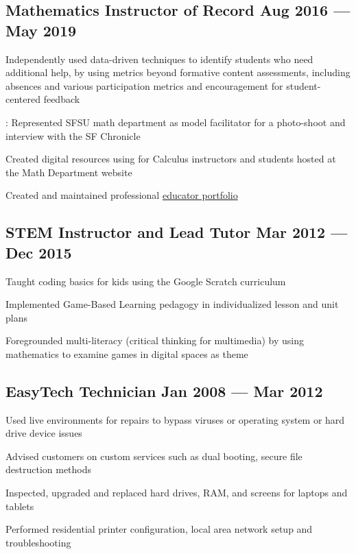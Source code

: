 \documentclass[letter,10pt]{article}
\begin{document}
\subsection{Mathematics Instructor of Record  \hfill	Aug 2016 --- May 2019}
\begin{zitemize}
\item Independently used data-driven techniques to identify students who need additional help, by using metrics beyond formative content assessments, including absences and various participation metrics and encouragement for student-centered feedback
\item {}: Represented SFSU math department as model facilitator for a photo-shoot and interview with the SF Chronicle
\item Created digital resources using  for Calculus instructors and students hosted at the Math Department website  
\item Created and maintained professional  \href{http://www.mathwithtimmy.com}{educator portfolio}
\end{zitemize}

\subsection{STEM Instructor and Lead Tutor \hfill	Mar 2012 --- Dec 2015}
\begin{zitemize}
\item Taught coding basics for kids using the Google Scratch curriculum
\item Implemented Game-Based Learning pedagogy in individualized lesson and unit plans
\item Foregrounded multi-literacy (critical thinking for multimedia) by using mathematics to examine games in digital spaces as theme
\end{zitemize}
\subsection{EasyTech Technician \hfill	Jan 2008 --- Mar 2012}
\begin{zitemize}
\item Used  live environments for repairs to bypass viruses or operating system or hard drive device issues
\item Advised customers on custom services such as dual booting, secure file destruction methods
\item Inspected, upgraded and replaced hard drives, RAM, and screens for laptops and tablets
\item Performed residential printer configuration, local area network setup and troubleshooting
\end{zitemize}
\end{document}
